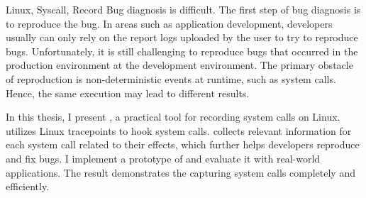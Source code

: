 
\begin{英文摘要}{Linux, Syscall, Record}
    Bug diagnosis is difficult. The first step of bug diagnosis is to reproduce the bug. In areas such as application development, developers usually can only rely on the report logs uploaded by the user to try to reproduce bugs.
    Unfortunately, it is still challenging to reproduce bugs that occurred in the production environment at the development environment. The primary obstacle of reproduction is non-deterministic events at runtime, such as system calls. Hence,  the same execution may lead to different results.

    In this thesis, I present \TheName, a practical tool for recording system calls on Linux. \TheName utilizes Linux tracepoints to hook system calls.
    \TheName collects relevant information for each system call related to their effects, which further helps developers reproduce and fix bugs. I implement a prototype of \TheName and evaluate it with real-world applications. The result demonstrates the \TheName capturing system calls completely and efficiently. 
\end{英文摘要}
